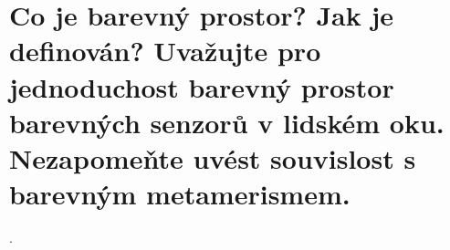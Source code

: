 \section{Co je barevný prostor? Jak je definován? Uvažujte pro jednoduchost barevný prostor barevných senzorů v lidském 
oku. Nezapomeňte uvést souvislost s barevným metamerismem.}.